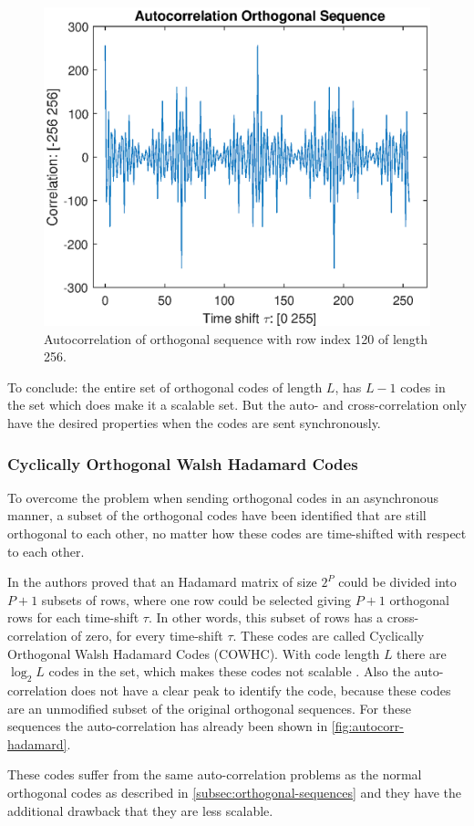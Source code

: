 \begin{figure}[t]
	\centering
	\includegraphics[width=\textwidth]{chapters/cdma-chapters/codes/autocorr-hadamard.eps}
	\caption{Autocorrelation of orthogonal sequence with row index 120 of length 256.}
	\label{fig:autocorr-hadamard}
\end{figure}





To conclude: the entire set of orthogonal codes of length $L$, has $L - 1$ codes in the set which does make it a scalable set.
But the auto- and cross-correlation only have the desired properties when the codes are sent synchronously. 




\subsubsection{Cyclically Orthogonal Walsh Hadamard Codes}

To overcome the problem when sending orthogonal codes in an asynchronous manner, a subset of the orthogonal codes have been identified that are still orthogonal to each other, no matter how these codes are time-shifted with respect to each other.

In \cite{1182447} the authors proved that an Hadamard matrix of size $2^P$ could be divided into $P + 1$ subsets of rows, where one row could be selected giving $P + 1$ orthogonal rows for each time-shift $\tau$.
In other words, this subset of rows has a cross-correlation of zero, for every time-shift $\tau$.
These codes are called Cyclically Orthogonal Walsh Hadamard Codes (COWHC).
With code length $L$ there are $\log_2 L$ codes in the set, which makes these codes not scalable \cite{1182447}. 
Also the auto-correlation does not have a clear peak to identify the code, because these codes are an unmodified subset of the original orthogonal sequences.
For these sequences the auto-correlation has already been shown in \autoref{fig:autocorr-hadamard}.

These codes suffer from the same auto-correlation problems as the normal orthogonal codes as described in \autoref{subsec:orthogonal-sequences} and they have the additional drawback that they are less scalable.